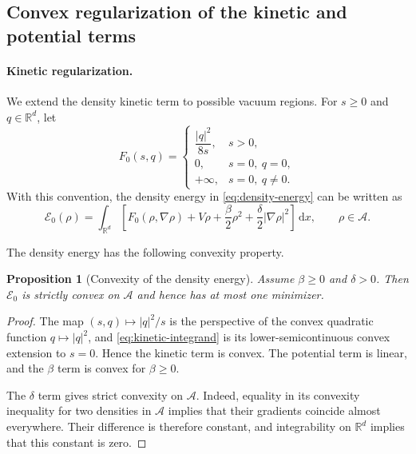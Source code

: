 \documentclass[11pt]{article}
\newcommand{\R}{\mathbb{R}}
\newcommand{\A}{\mathcal{A}}
\newcommand{\E}{\mathcal{E}}
\newcommand{\dd}{\,\mathrm{d}}
\theoremstyle{plain}
\newtheorem{proposition}[theorem]{Proposition}
\theoremstyle{definition}
\numberwithin{equation}{section}
\begin{document}
\subsection{Convex regularization of the kinetic and potential terms}

\paragraph{Kinetic regularization.}

We extend the density kinetic term to possible vacuum regions.
For $s\ge0$ and $q\in\R^d$, let
\begin{equation}
\label{eq:kinetic-integrand}
F_0(s,q)
=
\begin{cases}
\dfrac{|q|^2}{8s}, & s>0,\\[1ex]
0, & s=0,\ q=0,\\
+\infty, & s=0,\ q\ne0.
\end{cases}
\end{equation}
With this convention, the density energy in
\eqref{eq:density-energy} can be written as
\begin{equation}
\label{eq:density-energy-extended}
\E_0(\rho)
=
\int_{\R^d}
\left[
F_0(\rho,\nabla\rho)
+V\rho
+\frac{\beta}{2}\rho^2
+\frac{\delta}{2}|\nabla\rho|^2
\right]\dd x,
\qquad
\rho\in\A.
\end{equation}

The density energy has the following convexity property.

\begin{proposition}[Convexity of the density energy]
\label{prop:density-convexity}
Assume $\beta\ge0$ and $\delta>0$.
Then $\E_0$ is strictly convex on $\A$ and hence has at most one
minimizer.
\end{proposition}

\begin{proof}
The map $(s,q)\mapsto |q|^2/s$ is the perspective of the convex
quadratic function $q\mapsto |q|^2$, and
\eqref{eq:kinetic-integrand} is its lower-semicontinuous convex
extension to $s=0$. Hence the kinetic term is convex. The potential
term is linear, and the $\beta$ term is convex for $\beta\ge0$.

The $\delta$ term gives strict convexity on $\A$. Indeed, equality in
its convexity inequality for two densities in $\A$ implies that their
gradients coincide almost everywhere. Their difference is therefore
constant, and integrability on $\R^d$ implies that this constant is
zero.
\end{proof}
\end{document}
